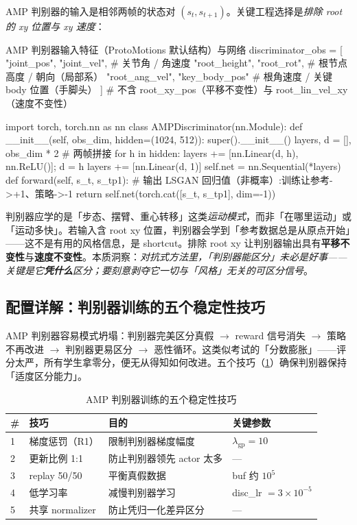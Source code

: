AMP 判别器的输入是相邻两帧的状态对 $(s_t,s_{t+1})$。关键工程选择是\emph{排除 root 的 xy 位置与 xy 速度}：

\begin{codebox}[Python]{AMP 判别器输入特征（ProtoMotions 默认结构）与网络}
discriminator_obs = [
    "joint_pos", "joint_vel",      # 关节角 / 角速度
    "root_height", "root_rot",     # 根节点高度 / 朝向（局部系）
    "root_ang_vel", "key_body_pos" # 根角速度 / 关键 body 位置（手脚头）
]
# 不含 root_xy_pos（平移不变性）与 root_lin_vel_xy（速度不变性）

import torch, torch.nn as nn
class AMPDiscriminator(nn.Module):
    def __init__(self, obs_dim, hidden=(1024, 512)):
        super().__init__()
        layers, d = [], obs_dim * 2          # 两帧拼接
        for h in hidden:
            layers += [nn.Linear(d, h), nn.ReLU()]; d = h
        layers += [nn.Linear(d, 1)]
        self.net = nn.Sequential(*layers)
    def forward(self, s_t, s_tp1):
        # 输出 LSGAN 回归值（非概率）:训练让参考->+1、策略->-1
        return self.net(torch.cat([s_t, s_tp1], dim=-1))
\end{codebox}

\begin{insight}[排除 root xy = 让判别器学「运动模式」而非「在哪运动」]\label{ins:rlmc-imit-rootxy}
判别器应学的是「步态、摆臂、重心转移」这类\emph{运动模式}，而非「在哪里运动」或「运动多快」。若输入含 root xy 位置，判别器会学到「参考数据总是从原点开始」——这不是有用的风格信息，是 shortcut。排除 root xy 让判别器输出具有\textbf{平移不变性}与\textbf{速度不变性}。本质洞察：\emph{对抗式方法里，「判别器能区分」未必是好事——关键是它\textbf{凭什么}区分；要刻意剥夺它一切与「风格」无关的可区分信号}。
\end{insight}

\subsection{配置详解：判别器训练的五个稳定性技巧}
\label{sec:rlmc-imit-amp-tricks}

AMP 判别器容易模式坍塌：判别器完美区分真假 $\to$ reward 信号消失 $\to$ 策略不再改进 $\to$ 判别器更易区分 $\to$ 恶性循环。这类似考试的「分数膨胀」——评分太严，所有学生拿零分，便无从得知如何改进。五个技巧（\cref{tab:rlmc-imit-amptricks}）确保判别器保持「适度区分能力」。

\begin{table}[ht]
\centering
\small
\caption{AMP 判别器训练的五个稳定性技巧}
\label{tab:rlmc-imit-amptricks}
\begin{tabular}{@{}llll@{}}
\toprule
\# & 技巧 & 目的 & 关键参数 \\
\midrule
1 & 梯度惩罚（R1） & 限制判别器梯度幅度 & $\lambda_{\text{gp}}=10$ \\
2 & 更新比例 1:1 & 防止判别器领先 actor 太多 & --- \\
3 & replay 50/50 & 平衡真假数据 & buf 约 $10^5$ \\
4 & 低学习率 & 减慢判别器学习 & disc\_lr $=3\times10^{-5}$ \\
5 & 共享 normalizer & 防止凭归一化差异区分 & --- \\
\bottomrule
\end{tabular}
\end{table}

